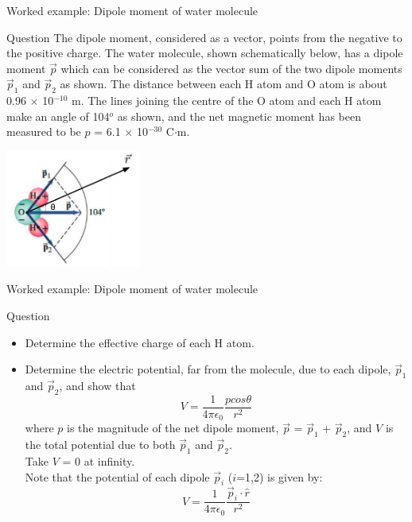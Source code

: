 %
%

{
\problemslide

%
%
%

\begin{frame}{Worked example: Dipole moment of water molecule}

  \begin{blockexmplque}{Question}
     The dipole moment, considered as a vector, points from the negative to
     the positive charge. The water molecule, shown schematically below,
     has a dipole moment $\vec{p}$ which can be considered as the vector sum
     of the two dipole moments $\vec{p}_1$ and $\vec{p}_2$ as shown.
     The distance between each  H atom and O atom is about
     0.96 $\times$ 10$^{-10}$ m. The lines joining the centre of the O atom
     and each H atom make an angle of 104$^o$ as shown, and the net
     magnetic moment has been measured to be $p$ = 6.1 $\times$ 10$^{-30}$ C$\cdot$m.
    \begin{center}
      \includegraphics[width=0.33\textwidth]{./images/problems/lect04_water_dipole_2}\\
    \end{center}
  \end{blockexmplque}

\end{frame}

%
%
%

\begin{frame}{Worked example: Dipole moment of water molecule}

  \begin{blockexmplque}{Question}
    \begin{itemize}
      \item
      Determine the effective charge of each H atom.
      \item
      Determine the electric potential, far from the molecule,
      due to each dipole, $\vec{p}_1$ and $\vec{p}_2$,
      and show that
      \begin{equation*}
         V = \frac{1}{4\pi \epsilon_0} \frac{p cos\theta}{r^2}
      \end{equation*}
      where $p$ is the magnitude of the net dipole moment,
      $\vec{p}$ = $\vec{p}_1$ + $\vec{p}_2$,
      and $V$ is the total potential due to both $\vec{p}_1$ and $\vec{p}_2$.\\
      Take $V$ = 0 at infinity.\\
      Note that the potential of each dipole $\vec{p}_i$ ($i$=1,2) is given by:
      \begin{equation*}
         V = \frac{1}{4\pi \epsilon_0} \frac{\vec{p}_i \cdot \hat{r}}{r^2}
      \end{equation*}
    \end{itemize}
  \end{blockexmplque}


\end{frame}}
